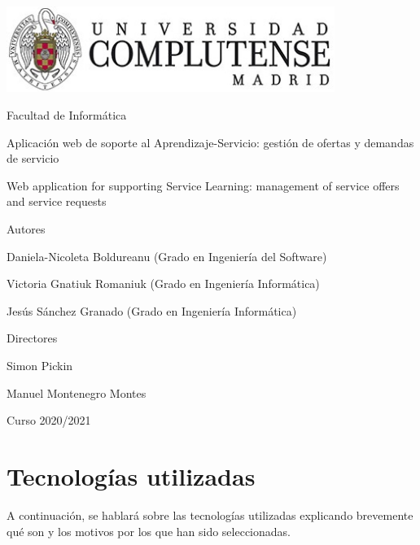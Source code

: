 \documentclass[11pt]{book}
\begin{document}
	\begin{titlepage}
		\centering
		{\includegraphics[width=0.8\textwidth]{logo}\par}
		\vspace{1cm}
		{\Large Facultad de Informática \par}
		\vspace{1cm}
		{\Huge Aplicación web de soporte al Aprendizaje-Servicio: gestión de ofertas y demandas de servicio\par}
		\vspace{1cm}
		{\Huge Web application for supporting Service Learning: management of service offers and service requests \par}
		\vspace{2cm}
		{\textbf\Large Autores \par}
		{\Large Daniela-Nicoleta Boldureanu (Grado en Ingeniería del Software)\par}
		{\Large Victoria Gnatiuk Romaniuk (Grado en Ingeniería Informática)\par}
		{\Large Jesús Sánchez Granado (Grado en Ingeniería Informática)\par}
		\vspace{1cm}
		{\textbf\Large Directores \par}
		{\Large Simon Pickin \par}
		{\Large Manuel Montenegro Montes \par}
		\vspace{2cm}
		{\Large Curso 2020/2021 \par}
	\end{titlepage}
	
	\tableofcontents
	\newpage
	\listoffigures
\chapter{Tecnologías utilizadas}
A continuación, se hablará sobre las tecnologías utilizadas explicando brevemente qué son y los motivos por los que han sido seleccionadas.
	
\end{document}
